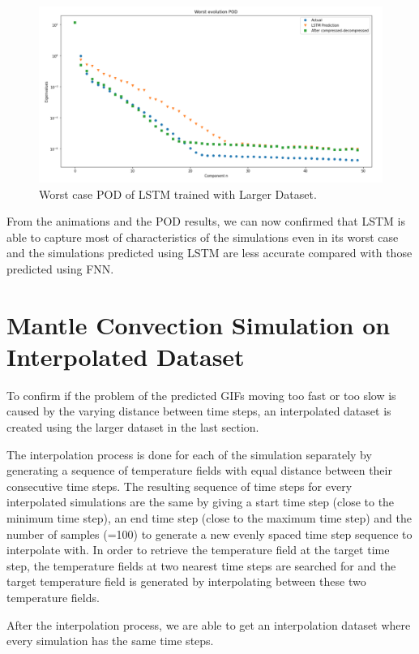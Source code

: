 \begin{figure}[H]
    \caption{Worst case POD of LSTM trained with Larger Dataset.}
    \includegraphics[scale=0.5]{figures/mantle_convection_images/larger_dataset/LSTM_Worst_POD.png}
\end{figure}

From the animations and the POD results, we can now confirmed that LSTM is able to capture most of characteristics of the simulations even in its worst case and the simulations predicted using LSTM are less accurate compared with those predicted using FNN.


\section{Mantle Convection Simulation on Interpolated Dataset}

To confirm if the problem of the predicted GIFs moving too fast or too slow is caused by the varying distance between time steps, an interpolated dataset is created using the larger dataset in the last section.

The interpolation process is done for each of the simulation separately by generating a sequence of temperature fields with equal distance between their consecutive time steps. The resulting sequence of time steps for every interpolated simulations are the same by giving a start time step (close to the minimum time step), an end time step (close to the maximum time step) and the number of samples (=100) to generate a new evenly spaced time step sequence to interpolate with. In order to retrieve the temperature field at the target time step, the temperature fields at two nearest time steps are searched for and the target temperature field is generated by interpolating between these two temperature fields.

After the interpolation process, we are able to get an interpolation dataset where every simulation has the same time steps.


